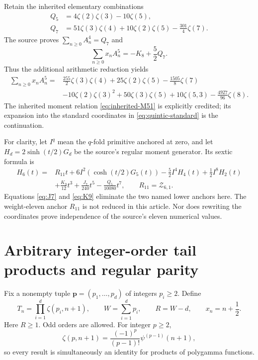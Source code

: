 \documentclass[11pt,letterpaper]{article}
\numberwithin{equation}{section}
\theoremstyle{definition}\newtheorem{definition}[theorem]{Definition}
\theoremstyle{remark}\newtheorem{remark}[theorem]{Remark}
\begin{document}
Retain the inherited elementary combinations
\begin{align}
 Q_5&=4\zeta(2)\zeta(3)-10\zeta(5),\label{eq:Q5}\\
 Q_7&=51\zeta(3)\zeta(4)+10\zeta(2)\zeta(5)
                              -\frac{301}{4}\zeta(7).\label{eq:Q7}
\end{align}
The source proves $\sum_{n\ge0}A_n^4=Q_7$ and
\begin{equation}\label{eq:inherited-M51}
 \sum_{n\ge0}x_nA_n^5=-K_8+\frac52Q_7.
\end{equation}
Thus the additional arithmetic reduction yields
\begin{equation}\label{eq:quintic-standard}
\begin{split}
 \sum_{n\ge0}x_nA_n^5={}&
 \frac{255}{2}\zeta(3)\zeta(4)+25\zeta(2)\zeta(5)
                       -\frac{1505}{8}\zeta(7)\\
 &-10\zeta(2)\zeta(3)^2+50\zeta(3)\zeta(5)
                       +10\zeta(5,3)-\frac{4927}{96}\zeta(8).
\end{split}
\end{equation}
The inherited moment relation \eqref{eq:inherited-M51} is explicitly
credited; its expansion into the standard coordinates in
\eqref{eq:quintic-standard} is the continuation.

For clarity, let $I^q$ mean the $q$-fold primitive anchored at zero,
and let $H_d=2\sinh(t/2)G_d$ be the source's regular moment generator.
Its sextic formula is
\begin{equation}\label{eq:inherited-H6}
\begin{split}
 H_6(t)={}&R_{11}t+6I^2(\cosh(t/2)G_5(t))
                 -\frac52I^4H_4(t)+\frac12I^8H_2(t)\\
 &+\frac{K_9}{12}t^3+\frac{J_7}{240}t^5-\frac{Q_5}{10080}t^7,
 \qquad R_{11}=\mathcal Z_{6,1}.
\end{split}
\end{equation}
Equations \eqref{eq:J7} and \eqref{eq:K9} eliminate the two named
lower anchors here. The weight-eleven anchor $R_{11}$ is not reduced
in this article. Nor does rewriting the coordinates prove independence
of the source's eleven numerical values.

\section{Arbitrary integer-order tail products and regular parity}
\label{sec:mixed}

Fix a nonempty tuple $\boldsymbol p=(p_1,\ldots,p_d)$ of integers
$p_i\ge2$. Define
\begin{equation}\label{eq:mixed-def}
 T_n=\prod_{i=1}^d\zeta(p_i,n+1),\qquad
 W=\sum_{i=1}^dp_i,\qquad R=W-d,\qquad x_n=n+\frac12.
\end{equation}
Here $R\ge1$. Odd orders are allowed. For integer $p\ge2$,
\[
 \zeta(p,n+1)=\frac{(-1)^p}{(p-1)!}\psi^{(p-1)}(n+1),
\]
so every result is simultaneously an identity for products of
polygamma functions.
\end{document}
